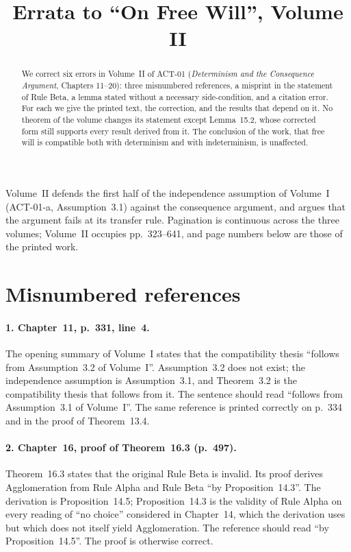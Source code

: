 \documentclass{situationist-preprint}
\title{Errata to \enquote{On Free Will}, Volume II}
\begin{document}
\maketitle

\begin{abstract}
We correct six errors in Volume~II of ACT-01 (\emph{Determinism and the Consequence Argument}, Chapters 11--20): three misnumbered references, a misprint in the statement of Rule Beta, a lemma stated without a necessary side-condition, and a citation error. For each we give the printed text, the correction, and the results that depend on it. No theorem of the volume changes its statement except Lemma~15.2, whose corrected form still supports every result derived from it. The conclusion of the work, that free will is compatible both with determinism and with indeterminism, is unaffected.
\end{abstract}

Volume~II defends the first half of the independence assumption of Volume~I (ACT-01-a, Assumption~3.1) against the consequence argument, and argues that the argument fails at its transfer rule. Pagination is continuous across the three volumes; Volume~II occupies pp.~323--641, and page numbers below are those of the printed work.

\section{Misnumbered references}

\paragraph{1. Chapter~11, p.~331, line~4.} The opening summary of Volume~I states that the compatibility thesis \enquote{follows from Assumption~3.2 of Volume~I}. Assumption~3.2 does not exist; the independence assumption is Assumption~3.1, and Theorem~3.2 is the compatibility thesis that follows from it. The sentence should read \enquote{follows from Assumption~3.1 of Volume~I}. The same reference is printed correctly on p.~334 and in the proof of Theorem~13.4.

\paragraph{2. Chapter~16, proof of Theorem~16.3 (p.~497).} Theorem~16.3 states that the original Rule Beta is invalid. Its proof derives Agglomeration from Rule Alpha and Rule Beta \enquote{by Proposition~14.3}. The derivation is Proposition~14.5; Proposition~14.3 is the validity of Rule Alpha on every reading of \enquote{no choice} considered in Chapter~14, which the derivation uses but which does not itself yield Agglomeration. The reference should read \enquote{by Proposition~14.5}. The proof is otherwise correct.
\end{document}
